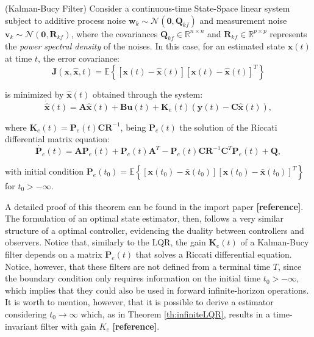 \documentclass[a4paper,11pt]{book}
\numberwithin{figure}{chapter}
\numberwithin{equation}{chapter}
\numberwithin{table}{chapter}
\newtheorem{theorem}{Theorem}[chapter]
\theoremstyle{definition}
\newcounter{boxed-theorem}
\newenvironment{boxed-theorem}[1]
{\begin{shaded} \begin{theorem}{#1}}
{\end{theorem} \end{shaded}}
\newcounter{boxed-definition}
\begin{document}
\begin{boxed-theorem}{(Kalman-Bucy Filter)} \label{th:kalmanBucy}
    Consider a continuous-time State-Space linear system subject to additive process noise $\bm{w}_k \sim \mathcal{N}(\bm{0}, \bm{Q}_{kf})$ and measurement noise $\bm{v}_k \sim \mathcal{N}(\bm{0}, \bm{R}_{kf})$, where the covariances $\bm{Q}_{kf} \in \mathbb{R}^{n \times n}$  and $\bm{R}_{kf} \in \mathbb{R}^{p \times p}$ represents the \emph{power spectral density} of the noises.   In this case, for an estimated state $\hat{\bm{x}}(t)$ at time $t$, the error covariance:
    \begin{equation}
        \bm{J}(\bm{x}, \hat{\bm{x}}, t) = \mathbb{E}\left\{ [\bm{x}(t) - \hat{\bm{x}}(t)][\bm{x}(t) - \hat{\bm{x}}(t)]^T \right\}
    \end{equation}
    
    \noindent is minimized by $\hat{\bm{x}}(t)$ obtained through the system:
    \begin{equation}
        \dot{\hat{\bm{x}}}(t) = \bm{A} \hat{\bm{x}}(t) + \bm{B} \bm{u}(t) + \bm{K}_{e}(t) \left( \bm{y}(t) - \bm{C} \hat{\bm{x}}(t) \right)
    ,\end{equation}
    
    \noindent where $\bm{K}_e(t) = \bm{P}_e(t)\bm{C}\bm{R}^{-1}$, being $\bm{P}_e(t)$ the solution of the Riccati differential matrix equation:
    \begin{equation}
        \dot{\bm{P}_e}(t) = \bm{A} \bm{P}_e(t) + \bm{P}_e(t) \bm{A}^T - \bm{P}_e(t)\bm{C}\bm{R}^{-1} \bm{C}^T \bm{P}_e(t) + \bm{Q}
    ,\end{equation}
    
    \noindent with initial condition $\bm{P}_e(t_0) = \mathbb{E} \left\{ [\bm{x}(t_0) - \bar{\bm{x}}(t_0)][\bm{x}(t_0) - \bar{\bm{x}}(t_0)]^T \right\}$ for $t_0 > -\infty$.
\end{boxed-theorem}

A detailed proof of this theorem can be found in the import paper \textbf{[reference]}. The formulation of an optimal state estimator, then, follows a very similar structure of a optimal controller, evidencing the duality between controllers and observers. Notice that, similarly to the LQR, the gain $\bm{K}_e(t)$ of a Kalman-Bucy filter depends on a matrix $\bm{P}_e(t)$ that solves a Riccati differential equation. Notice, however, that these filters are not defined from a terminal time $T$, since the boundary condition only requires information on the initial time $t_0 > -\infty$, which implies that they could also be used in forward infinite-horizon operations. It is worth to mention, however, that it is possible to derive a estimator considering $t_0 \to \infty$ which, as in Theorem \ref{th:infiniteLQR}, results in a time-invariant filter with gain $K_e$ \textbf{[reference]}.
\end{document}
